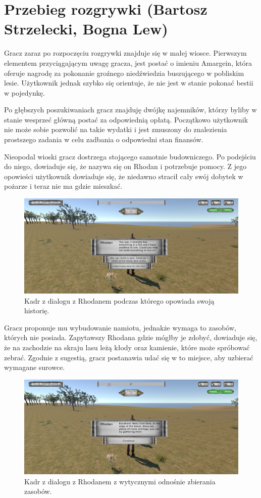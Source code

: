 \section{Przebieg rozgrywki (Bartosz Strzelecki, Bogna Lew)}
Gracz zaraz po rozpoczęciu rozgrywki znajduje się w małej wiosce. Pierwszym
elementem przyciągającym uwagę gracza, jest postać o imieniu Amargein, która oferuje
nagrodę za pokonanie groźnego niedźwiedzia buszującego w pobliskim lesie. Użytkownik jednak
szybko się orientuje, że nie jest w stanie pokonać bestii w pojedynkę.

Po głębszych poszukiwaniach gracz znajduję dwójkę najemników, którzy byliby w stanie
wesprzeć główną postać za odpowiednią opłatą. Początkowo użytkownik nie może sobie
pozwolić na takie wydatki i jest zmuszony do znalezienia prostszego zadania
w celu zadbania o odpowiedni stan finansów.

Nieopodal wioski gracz dostrzega stojącego samotnie budowniczego. Po podejściu do niego, dowiaduje się, że nazywa się on
Rhodan i potrzebuje pomocy. Z jego opowieści użytkownik dowiaduje się, że niedawno stracił cały swój dobytek w
pożarze i teraz nie ma gdzie mieszkać.

\begin{figure}[h!]
    \centering
    \includegraphics[width=1\textwidth]{images/rozgrywka/rhodan3.png}
    \caption{Kadr z dialogu z Rhodanem podczas którego opowiada swoją historię.}
\end{figure}

Gracz proponuje mu wybudowanie namiotu, jednakże wymaga to zasobów, których nie posiada. Zapytawszy Rhodana gdzie mógłby
je zdobyć, dowiaduje się, że na zachodzie na skraju lasu leżą kłody oraz kamienie, które może spróbować zebrać. Zgodnie
z sugestią, gracz postanawia udać się w to miejsce, aby uzbierać wymagane surowce.

\begin{figure}[h!]
    \centering
    \includegraphics[width=1\textwidth]{images/rozgrywka/rhodan4.png}
    \caption{Kadr z dialogu z Rhodanem z wytycznymi odnośnie zbierania zasobów.}
\end{figure}

